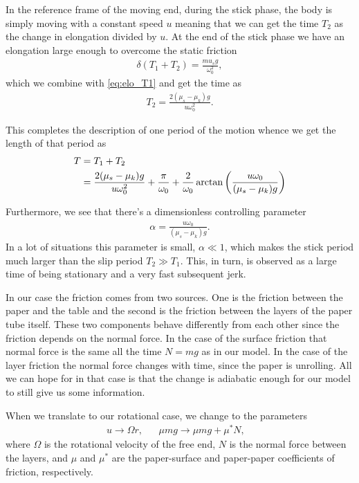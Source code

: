 \documentclass[10pt,a4paper,twocolumn]{article}
\begin{document}
In the reference frame of the moving end, during the stick phase, the body is simply moving with a constant speed $u$ meaning that we can get the time $T_2$ as the change in elongation divided by $u$. At the end of the stick phase we have an elongation large enough to overcome the static friction
%
\begin{align}
    \delta(T_1 + T_2) = \frac{mu_s g}{\omega_0^2},
\end{align}
%
which we combine with \cref{eq:elo_T1} and get the time as
%
\begin{align}
    T_2 = \frac{2 (\mu_s - \mu_k) g}{u \omega_0^2}.
\end{align}

This completes the description of one period of the motion whence we get the length of that period as
%
\begin{align}
    T &= T_1 + T_2 \notag\\
    &= \frac{2 (\mu_s - \mu_k) g}{u \omega_0^2} + \frac{\pi}{\omega_0} + \frac{2}{\omega_0} \arctan \left( \frac{u \omega_0}{(\mu_s - \mu_k) g} \right)
\end{align}

Furthermore, we see that there's a dimensionless controlling parameter
%
\begin{align}
    \alpha = \frac{u \omega_0}{(\mu_s - \mu_k) g}.
\end{align}
%
In a lot of situations this parameter is small, $\alpha \ll 1$, which makes the stick period much larger than the slip period $T_2 \gg T_1$. This, in turn, is observed as a large time of being stationary and a very fast subsequent jerk.

In our case the friction comes from two sources. One is the friction between the paper and the table and the second is the friction between the layers of the paper tube itself. These two components behave differently from each other since the friction depends on the normal force. In the case of the surface friction that normal force is the same all the time $N=mg$ as in our model. In the case of the layer friction the normal force changes with time, since the paper is unrolling. All we can hope for in that case is that the change is adiabatic enough for our model to still give us some information.

When we translate to our rotational case, we change to the parameters
%
\begin{align}
    u \rightarrow \Omega r,& &\mu m g \rightarrow \mu m g  + \mu^* N,&
\end{align}
%
where $\Omega$ is the rotational velocity of the free end, $N$ is the normal force between the layers, and $\mu$ and $\mu^*$ are the paper-surface and paper-paper coefficients of friction, respectively.
\end{document}
